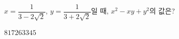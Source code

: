 $x=\dfrac{1}{3-2\sqrt{2}}$, $y=\dfrac{1}{3+2\sqrt{2}}$일 때, $x^2-xy+y^2$의 값은?
\begin{choices32}{$8$}{$17$}{$26$}{$33$}{$45$}\end{choices32}

